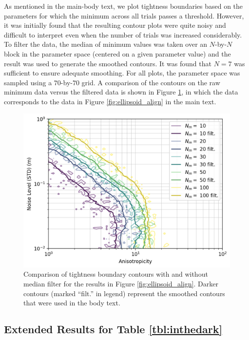 \documentclass[lettersize,journal]{IEEEtran}
\newcommand{\rev}[1]{\color{red}{#1}\color{black}}
\begin{document}
As mentioned in the main-body text, we plot tightness boundaries based on the parameters for which the minimum \rev{ER } across all trials passes a threshold. However, it was initially found that the resulting contour plots were quite noisy and difficult to interpret even when the number of trials was increased considerably. To filter the data, the median of minimum \rev{ER } values was taken over an $N$-by-$N$ block in the parameter space (centered on a given parameter value) and the result was used to generate the smoothed contours. It was found that $N=7$ was sufficient to ensure adequate smoothing. For all plots, the parameter space was sampled using a $70$-by-$70$ grid. A comparison of the contours on the raw minimum \rev{ER } data versus the filtered data is shown in Figure \ref{fig:filter}, in which the data corresponds to the data in Figure \ref{fig:ellipsoid_align} in the main text. 
\begin{figure}[!ht]
	\centering
	\includegraphics[width=\columnwidth]{figs/filter_compare}
	\caption{Comparison of tightness boundary contours with and without median filter for the results in Figure \ref{fig:ellipsoid_align}. Darker contours (marked ``filt.'' in legend) represent the smoothed contours that were used in the body text.}
	\label{fig:filter}
\end{figure}


\subsection{Extended Results for Table \ref{tbl:inthedark}}
\end{document}
